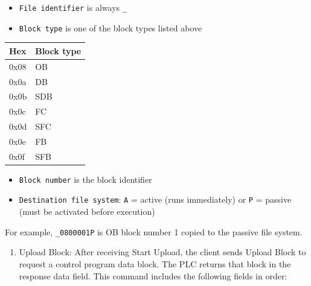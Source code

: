 ﻿\documentclass[../main.tex]{subfiles}
\begin{document}
\begin{itemize}
    \item \texttt{File identifier} is always \texttt{\_}
    \item \texttt{Block type} is one of the block types listed above
\end{itemize}


\begin{table}[H]
    \centering
    \footnotesize
    \begin{tabular}{|l|l|}
        \hline
        Hex & Block type \\
        \hline
        0x08 & OB \\
        \hline
        0x0a & DB \\
        \hline
        0x0b & SDB \\
        \hline
        0x0c & FC \\
        \hline
        0x0d & SFC \\
        \hline
        0x0e & FB \\
        \hline
        0x0f & SFB \\
        \hline
    \end{tabular}
\end{table}


\begin{itemize}
    \item \texttt{Block number} is the block identifier
    \item \texttt{Destination file system}: \texttt{A} = active (runs immediately) or \texttt{P} = passive (must be activated before execution)
\end{itemize}


    For example, \texttt{\_0800001P} is OB block number 1 copied to the passive file system.


\begin{enumerate}
    \item Upload Block: After receiving Start Upload, the client sends Upload Block to request a control program data block. The PLC returns that block in the response data field. This command includes the following fields in order:
\end{enumerate}
\end{document}
